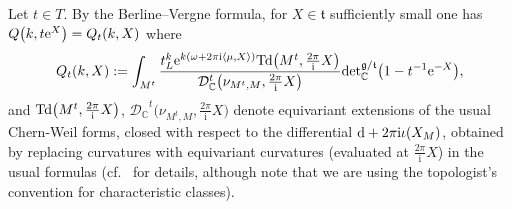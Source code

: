\documentclass[11pt]{article}
\numberwithin{equation}{section}
\newcommand{\pair}[2]{\langle #1, #2 \rangle}
\newcommand{\tn}[1]{\textnormal{#1}}
\renewcommand{\i}{{\mathrm{i}}}
\def\g{\ensuremath{\mathfrak{g}}}
\def\t{\ensuremath{\mathfrak{t}}}
\def\bC{\ensuremath{\mathbb{C}}}
\def\Td{\ensuremath{\textnormal{Td}}}
\def\calDC{\ensuremath{\mathcal{D}_{\bC}}}
\def\de{\ensuremath{\tn{det}_\bC}}
\begin{document}
Let $t \in T$. By the Berline--Vergne formula, for $X \in \t$ sufficiently small one has $Q\big(k,t{\rm e}^X\big)=Q_t(k,X)$ where
\begin{gather}\label{eqn:BerVer}
Q_t(k,X):=\int_{M^t} \frac{t_L^k {\rm e}^{k(\omega+2\pi \i\pair{\mu}{X})}\Td\big(M^t,\tfrac{2\pi}{\i}X\big)}{\calDC^t\big(\nu_{M^t,M},\tfrac{2\pi}{\i}X\big)}\de^{\g/\t}\big(1-t^{-1}{\rm e}^{-X}\big),
\end{gather}
and $\Td\big(M^t,\tfrac{2\pi}{\i}X\big)$, $\calDC^t\big(\nu_{M^t,M},\tfrac{2\pi}{\i}X\big)$ denote equivariant extensions of the usual Chern-Weil forms, closed with respect to the differential ${\rm d}+2\pi \i \iota(X_M)$, obtained by replacing curvatures with equivariant curvatures (evaluated at $\tfrac{2\pi}{\i}X$) in the usual formulas (cf.~\cite{BerlineGetzlerVergne} for details, although note that we are using the topologist's convention for characteristic classes).
\end{document}
